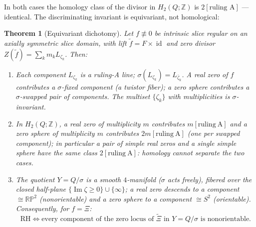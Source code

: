 \documentclass[11pt]{amsart}
\theoremstyle{plain}
\newtheorem{mainthm}{Theorem}
\theoremstyle{definition}
\theoremstyle{remark}
\newcommand{\ZZ}{\mathbb{Z}}
\newcommand{\RP}{\mathbb{RP}}
\newcommand{\im}{\operatorname{Im}}
\newcommand{\id}{\operatorname{id}}
\begin{document}
In both cases the homology class of the divisor in $H_2(Q;\ZZ)$ is $2[\text{ruling A}]$ ---
identical. The discriminating invariant is equivariant, not homological:

\begin{mainthm}[Equivariant dichotomy]\label{thm:dichotomy}
Let $f\not\equiv0$ be intrinsic slice regular on an axially symmetric slice domain, with lift
$\tilde f=F\times\id$ and zero divisor $Z(\tilde f)=\sum_k m_k L_{\zeta_k}$. Then:
\begin{enumerate}
\item Each component $L_{\zeta_k}$ is a ruling-A line; $\sigma(L_{\zeta_k})=L_{\bar\zeta_k}$.
A real zero of $f$ contributes a $\sigma$-\emph{fixed} component (a twistor fiber); a zero sphere
contributes a $\sigma$-\emph{swapped pair} of components. The multiset $\{\zeta_k\}$ with
multiplicities is $\sigma$-invariant.
\item In $H_2(Q;\ZZ)$, a real zero of multiplicity $m$ contributes $m[\mathrm{ruling~A}]$ and a
zero sphere of multiplicity $m$ contributes $2m[\mathrm{ruling~A}]$ (one per swapped component);
in particular a pair of simple real zeros and a single simple sphere have the same class
$2[\mathrm{ruling~A}]$: homology cannot separate the two cases.
\item The quotient $Y=Q/\sigma$ is a smooth $4$-manifold ($\sigma$ acts freely), fibered over the
closed half-plane $\{\im\zeta\ge0\}\cup\{\infty\}$; a real zero descends to a component $\cong\RP^2$
(nonorientable) and a zero sphere to a component $\cong S^2$ (orientable). Consequently, for
$f=\Xi$:
\[
\text{RH}\iff\text{every component of the zero locus of }\tilde\Xi\text{ in }Y=Q/\sigma
\text{ is nonorientable.}
\]
\end{enumerate}
\end{mainthm}
\end{document}
